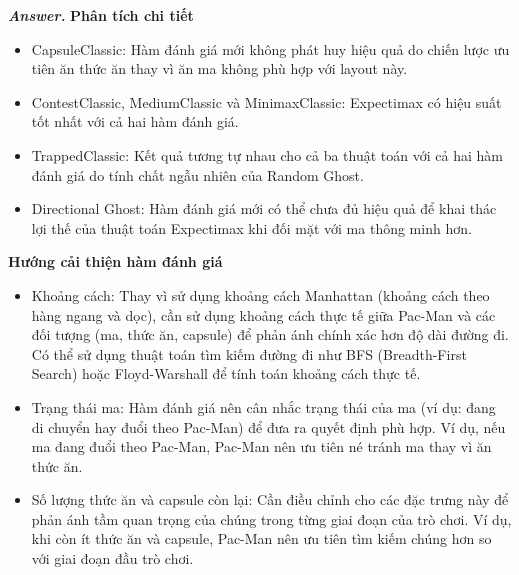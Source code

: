 \documentclass[12pt]{article}
\newenvironment{solution}[1][\it{Answer}]{\textbf{#1. } }{}
\begin{document}
\begin{solution}
\hspace{-1em}\textbf{Phân tích chi tiết}
\begin{itemize}
    \item CapsuleClassic: Hàm đánh giá mới không phát huy hiệu quả do chiến lược ưu tiên ăn thức ăn thay vì ăn ma không phù hợp với layout này.
    \item ContestClassic, MediumClassic và MinimaxClassic: Expectimax có hiệu suất tốt nhất với cả hai hàm đánh giá.
    \item TrappedClassic: Kết quả tương tự nhau cho cả ba thuật toán với cả hai hàm đánh giá do tính chất ngẫu nhiên của Random Ghost.
    \item Directional Ghost: Hàm đánh giá mới có thể chưa đủ hiệu quả để khai thác lợi thế của thuật toán Expectimax khi đối mặt với ma thông minh hơn.
\end{itemize}

\hspace{-1em}\textbf{Hướng cải thiện hàm đánh giá}
\begin{itemize}
    \item Khoảng cách: Thay vì sử dụng khoảng cách Manhattan (khoảng cách theo hàng ngang và dọc), cần sử dụng khoảng cách thực tế giữa Pac-Man và các đối tượng (ma, thức ăn, capsule) để phản ánh chính xác hơn độ dài đường đi. Có thể sử dụng thuật toán tìm kiếm đường đi như BFS (Breadth-First Search) hoặc Floyd-Warshall để tính toán khoảng cách thực tế.
    \item Trạng thái ma: Hàm đánh giá nên cân nhắc trạng thái của ma (ví dụ: đang di chuyển hay đuổi theo Pac-Man) để đưa ra quyết định phù hợp. Ví dụ, nếu ma đang đuổi theo Pac-Man, Pac-Man nên ưu tiên né tránh ma thay vì ăn thức ăn.
    \item Số lượng thức ăn và capsule còn lại: Cần điều chỉnh cho các đặc trưng này để phản ánh tầm quan trọng của chúng trong từng giai đoạn của trò chơi. Ví dụ, khi còn ít thức ăn và capsule, Pac-Man nên ưu tiên tìm kiếm chúng hơn so với giai đoạn đầu trò chơi.
\end{itemize}


\end{solution}
\end{document}
